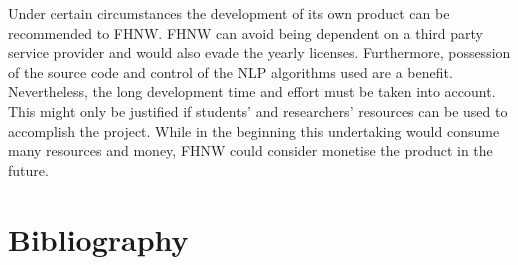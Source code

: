 \documentclass[runningheads]{llncs}
\begin{document}
Under certain circumstances the development of its own product can be recommended to FHNW. FHNW can avoid being dependent on a third party service provider and would also evade the yearly licenses. Furthermore, possession of the source code and control of the NLP algorithms used are a benefit. Nevertheless, the long development time and effort must be taken into account. This might only be justified if students' and researchers' resources can be used to accomplish the project. While in the beginning this undertaking would consume many resources and money, FHNW could consider monetise the product in the future.

\section{Bibliography}


\printbibliography
\end{document}
